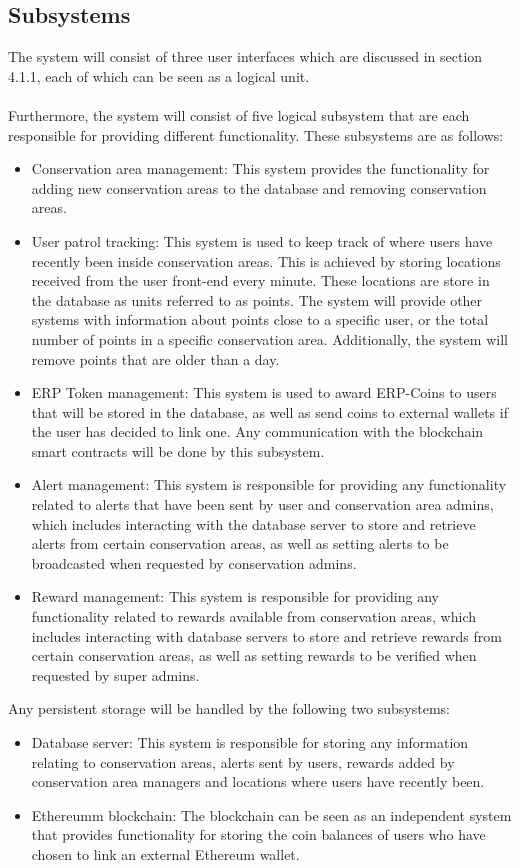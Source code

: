 \documentclass{article}
\begin{document}
\subsection{Subsystems}
The system will consist of three user interfaces which are discussed in section 4.1.1, each of which can be seen as a logical unit. \\\\Furthermore, the system will consist of five logical subsystem that are each responsible for providing different functionality. These subsystems are as follows:
\begin{itemize}
\item Conservation area management:
This system provides the functionality for adding new conservation areas to the database and removing conservation areas.
\item User patrol tracking:
This system is used to keep track of where users have recently been inside conservation areas. This is achieved by storing locations received from the user front-end every minute. These locations are store in the database as units referred to as points. The system will provide other systems with information about points close to a specific user, or the total number of points in a specific conservation area. Additionally, the system will remove points that are older than a day.
\item ERP Token management:
This system is used to award ERP-Coins to users that will be stored in the database, as well as send coins to external wallets if the user has decided to link one. Any communication with the blockchain smart contracts will be done by this subsystem.
\item Alert management:
This system is responsible for providing any functionality related to alerts that have been sent by user and conservation area admins, which includes interacting with the database server to store and retrieve alerts from certain conservation areas, as well as setting alerts to be broadcasted when requested by conservation admins.
\item Reward management:
This system is responsible for providing any functionality related to rewards available from conservation areas, which includes interacting with database servers to store and retrieve rewards from certain conservation areas, as well as setting rewards to be verified when requested by super admins.
\end{itemize} 
Any persistent storage will be handled by the following two subsystems:
\begin{itemize}
\item Database server:
This system is responsible for storing any information relating to conservation areas, alerts sent by users, rewards added by conservation area managers and locations where users have recently been.
\item Ethereumm blockchain:
The blockchain can be seen as an independent system that provides functionality for storing the coin balances of users who have chosen to link an external Ethereum wallet.  
\end{itemize}
\end{document}
